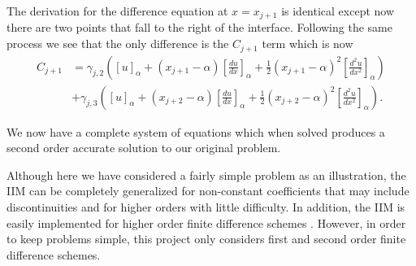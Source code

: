 The derivation for the difference equation at $x = x_{j+1}$ is identical except now there are two points that fall to the right of the interface.
Following the same process we see that the only difference is the $C_{j+1}$ term which is now
\begin{align}
    C_{j+1} & = \gamma_{j,2}\left([u]_\alpha + (x_{j+1} - \alpha)\left[\frac{du}{dx}\right]_\alpha + \frac{1}{2}(x_{j+1} - \alpha)^2\left[\frac{d^2u}{dx^2}\right]_\alpha\right) \\ \nonumber
    & + \gamma_{j,3}\left([u]_\alpha + (x_{j+2} - \alpha)\left[\frac{du}{dx}\right]_\alpha + \frac{1}{2}(x_{j+2} - \alpha)^2\left[\frac{d^2u}{dx^2}\right]_\alpha\right) .
\end{align}

We now have a complete system of equations which when solved produces a second order accurate solution to our original problem.

Although here we have considered a fairly simple problem as an illustration, the IIM can be completely generalized for non-constant coefficients that may include discontinuities and for higher orders with little difficulty.
In addition, the IIM is easily implemented for higher order finite difference schemes \cite{liito06}.
However, in order to keep problems simple, this project only considers first and second order finite difference schemes.
